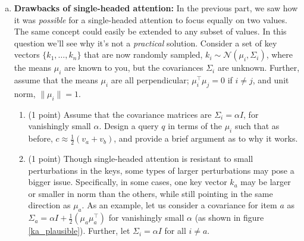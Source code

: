 \begin{enumerate}[(a)]
\begin{answer}
\end{answer}


\item {}  \textbf{Drawbacks of single-headed attention:} \label{q_problem_with_single_head}
In the previous part, we saw how it was \textit{possible} for a single-headed attention to focus equally on two values.
The same concept could easily be extended to any subset of values.
In this question we'll see why it's not a \textit{practical} solution.
Consider a set of key vectors $\{k_1,\dots,k_n\}$ that are now randomly sampled, $k_i\sim \mathcal{N}(\mu_i, \Sigma_i)$, where the means $\mu_i$ are known to you, but the covariances $\Sigma_i$ are unknown.
Further, assume that the means $\mu_i$ are all perpendicular; $\mu_i^\top \mu_j = 0$ if $i\not=j$, and unit norm, $\|\mu_i\|=1$.

    \begin{enumerate}
    \item (1 point) Assume that the covariance matrices are $\Sigma_i = \alpha I$, for vanishingly small $\alpha$.
    Design a query $q$ in terms of the $\mu_i$ such that as before, $c\approx \frac{1}{2}(v_a + v_b)$, and provide a brief argument as to why it works.

    \begin{answer}
    \end{answer}


    \item (1 point) Though single-headed attention is resistant to small perturbations in the keys, some types of larger perturbations may pose a bigger issue. Specifically, in some cases, one key vector $k_a$ may be larger or smaller in norm than the others, while still pointing in the same direction as $\mu_a$. As an example, let us consider a covariance for item $a$ as $\Sigma_a = \alpha I + \frac{1}{2}(\mu_a\mu_a^\top)$ for vanishingly small $\alpha$ (as shown in figure \ref{ka_plausible}).
    Further, let $\Sigma_i = \alpha I$ for all $i \neq a$. %


\end{enumerate}
\end{enumerate}
